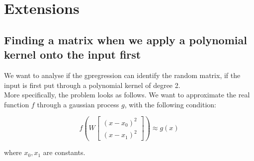 \chapter{Extensions}

\ifpdf
    \graphicspath{{Chapter3/Figs/Raster/}{Chapter3/Figs/PDF/}{Chapter3/Figs/}}
\else
    \graphicspath{{Chapter3/Figs/Vector/}{Chapter3/Figs/}}
\fi

\section{Finding a matrix when we apply a polynomial kernel onto the input first}
We want to analyse if the gpregression can identify the random matrix, if the input is first put through a polynomial kernel of degree 2. \\

More specifically, the problem looks as follows.
We want to approximate the real function $ f $ through a gaussian process $ g $, with the following condition:

\def\B{
\begin{bmatrix}
    (x - x_0)^2 \\
    (x - x_1)^2
\end{bmatrix}}

\begin{equation}
f \left( W \B \right) \approx g \left( x \right)
\end{equation} 

where $x_0, x_1$ are constants.






